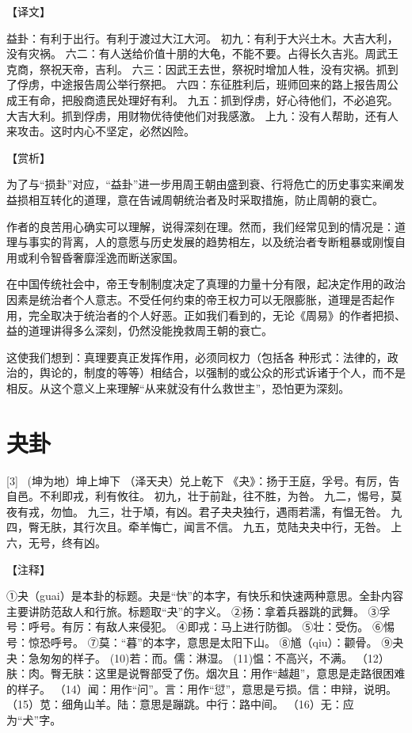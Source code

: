 \documentclass[12pt,UTF8]{ctexbook}
\begin{document}
【译文】

益卦：有利于出行。有利于渡过大江大河。
初九：有利于大兴土木。大吉大利，没有灾祸。
六二：有人送给价值十朋的大龟，不能不要。占得长久吉兆。周武王克商，祭祝天帝，吉利。
六三：因武王去世，祭祝时增加人牲，没有灾祸。抓到了俘虏，中途报告周公举行祭把。
六四：东征胜利后，班师回来的路上报告周公成王有命，把殷商遗民处理好有利。
九五：抓到俘虏，好心待他们，不必追究。大吉大利。抓到俘虏，用财物优待使他们对我感激。
上九：没有人帮助，还有人来攻击。这时内心不坚定，必然凶险。

【赏析】

为了与“损卦”对应，“益卦”进一步用周王朝由盛到衰、行将危亡的历史事实来阐发益损相互转化的道理，意在告诫周朝统治者及时采取措施，防止周朝的衰亡。

作者的良苦用心确实可以理解，说得深刻在理。然而，我们经常见到的情况是：道理与事实的背离，人的意愿与历史发展的趋势相左，以及统治者专断粗暴或刚愎自用或利令智昏奢靡淫逸而断送家国。

在中国传统社会中，帝王专制制度决定了真理的力量十分有限，起决定作用的政治因素是统治者个人意志。不受任何约束的帝王权力可以无限膨胀，道理是否起作用，完全取决于统治者的个人好恶。正如我们看到的，无论《周易》的作者把损、益的道理讲得多么深刻，仍然没能挽救周王朝的衰亡。

这使我们想到：真理要真正发挥作用，必须同权力（包括各 种形式：法律的，政治的，舆论的，制度的等等）相结合，以强制的或公众的形式诉诸于个人，而不是相反。从这个意义上来理解“从来就没有什么救世主”，恐怕更为深刻。

\chapter{夬卦}
[3] \ (坤为地）坤上坤下
（泽天夬）兑上乾下
《夬》：扬于王庭，孚号。有厉，告自邑。不利即戎，利有攸往。
初九，壮于前趾，往不胜，为咎。
九二，惕号，莫夜有戎，勿恤。
九三，壮于頄，有凶。君子夬夬独行，遇雨若濡，有愠无咎。
九四，臀无肤，其行次且。牵羊悔亡，闻言不信。
九五，苋陆夬夬中行，无咎。
上六，无号，终有凶。

【注释】

①夬（guai）是本卦的标题。夬是“快”的本字，有快乐和快速两种意思。全卦内容主要讲防范敌人和行旅。标题取“夬”的字义。
②扬：拿着兵器跳的武舞。
③孚号：呼号。有厉：有敌人来侵犯。
④即戎：马上进行防御。
⑤壮：受伤。
⑥惕号：惊恐呼号。
⑦莫：“暮”的本字，意思是太阳下山。
⑧馗（qiu）：颧骨。
⑨夬夬：急匆匆的样子。
(10)若：而。儒：淋湿。
(11)愠：不高兴，不满。
（12）肤：肉。臀无肤：这里是说臀部受了伤。烟次且：用作“越趄”，意思是走路很困难的样子。
（14）闻：用作“问”。言：用作“愆”，意思是亏损。信：申辩，说明。
（15）苋：细角山羊。陆：意思是蹦跳。中行：路中间。
（16）无：应为“犬”字。
\end{document}
